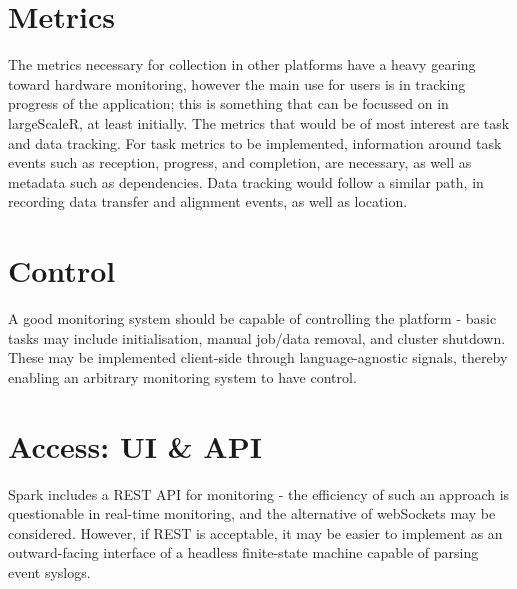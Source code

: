 \documentclass[a4paper,10pt]{article}
\begin{document}
\section{Metrics}\label{metr}

The metrics necessary for collection in other platforms have a heavy gearing
toward hardware monitoring, however the main use for users is in tracking
progress of the application; this is something that can be focussed on in
largeScaleR, at least initially.
The metrics that would be of most interest are task and data tracking.
For task metrics to be implemented, information around task events such as
reception, progress, and completion, are necessary, as well as metadata such as
dependencies.
Data tracking would follow a similar path, in recording data transfer and
alignment events, as well as location.

\section{Control}\label{conto}

A good monitoring system should be capable of controlling the platform - basic
tasks may include initialisation, manual job/data removal, and cluster
shutdown. These may be implemented client-side through language-agnostic
signals, thereby enabling an arbitrary monitoring system to have control.

\section{Access: UI \& API}\label{acces}

Spark includes a REST API for monitoring - the efficiency of such an approach
is questionable in real-time monitoring, and the alternative of webSockets may
be considered. However, if REST is acceptable, it may be easier to implement as
an outward-facing interface of a headless finite-state machine capable of
parsing event syslogs.

\printbibliography
\end{document}
